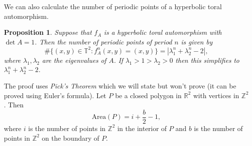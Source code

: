 \documentclass[12pt]{article}
\newtheorem{proposition}[theorem]{Proposition}
\theoremstyle{definition}
\theoremstyle{remark}
\begin{document}
We can also calculate the number of periodic points of a hyperbolic toral automorphism. 
\begin{proposition}
Suppose that $f_A$ is a hyperbolic toral automorphism with $\det A =1$. Then the number of periodic points of period $n$ is given by
\[
\#\{(x,y) \in \mathbb{T}^2 : f_A^n(x,y) = (x,y) \} = 
|\lambda_1^n + \lambda_2^n - 2|,
\]
where $\lambda_1, \lambda_2$ are the eigenvalues of $A$.
If $\lambda_1 >1>\lambda_2 >0$ then this simplifies to $\lambda_1^n + \lambda_2^n - 2$.
\end{proposition}

The proof uses {\it Pick's Theorem} which we will state but won't prove (it can be proved using Euler's formula). Let $P$ be a closed polygon in $\mathbb R^2$ with vertices in $\mathbb{Z}^2$. Then
\[
\mathrm{Area}(P) = i + \frac{b}{2} -1,
\]
where $i$ is the number of points in $\mathbb Z^2$ in the interior of $P$ and $b$ is the number of points in
$\mathbb Z^2$ on the boundary of $P$.
\end{document}

